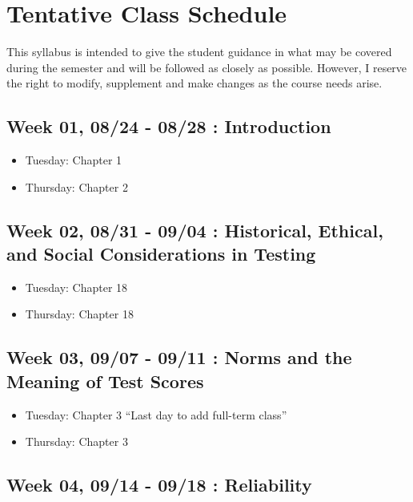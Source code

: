 \documentclass[11pt,]{article}
\providecommand{\tightlist}{%
  \setlength{\itemsep}{0pt}\setlength{\parskip}{0pt}}
\begin{document}
\section{Tentative Class Schedule}\label{tentative-class-schedule}

This syllabus is intended to give the student guidance in what may be
covered during the semester and will be followed as closely as possible.
However, I reserve the right to modify, supplement and make changes as
the course needs arise.

\subsection{Week 01, 08/24 - 08/28 :
Introduction}\label{week-01-0824---0828-introduction}

\begin{itemize}
\tightlist
\item
  Tuesday: Chapter 1
\item
  Thursday: Chapter 2
\end{itemize}

\subsection{Week 02, 08/31 - 09/04 : Historical, Ethical, and Social
Considerations in
Testing}\label{week-02-0831---0904-historical-ethical-and-social-considerations-in-testing}

\begin{itemize}
\tightlist
\item
  Tuesday: Chapter 18
\item
  Thursday: Chapter 18
\end{itemize}

\subsection{Week 03, 09/07 - 09/11 : Norms and the Meaning of Test
Scores}\label{week-03-0907---0911-norms-and-the-meaning-of-test-scores}

\begin{itemize}
\tightlist
\item
  Tuesday: Chapter 3 ``Last day to add full-term class''
\item
  Thursday: Chapter 3
\end{itemize}

\subsection{Week 04, 09/14 - 09/18 :
Reliability}\label{week-04-0914---0918-reliability}
\end{document}
